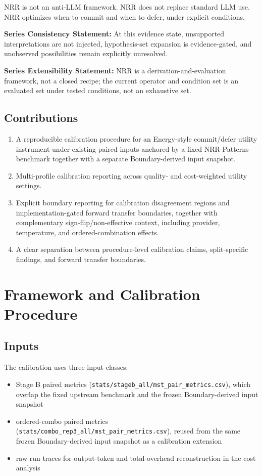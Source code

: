\documentclass[11pt,a4paper]{article}
\begin{document}
NRR is not an anti-LLM framework.
NRR does not replace standard LLM use.
NRR optimizes when to commit and when to defer, under explicit conditions.

\textbf{Series Consistency Statement:}
At this evidence state, unsupported interpretations are not injected, hypothesis-set expansion is evidence-gated, and unobserved possibilities remain explicitly unresolved.

\textbf{Series Extensibility Statement:}
NRR is a derivation-and-evaluation framework, not a closed recipe; the current operator and condition set is an evaluated set under tested conditions, not an exhaustive set.

\subsection{Contributions}

\begin{enumerate}
  \item A reproducible calibration procedure for an Energy-style commit/defer utility instrument under existing paired inputs anchored by a fixed NRR-Patterns benchmark together with a separate Boundary-derived input snapshot.
  \item Multi-profile calibration reporting across quality- and cost-weighted utility settings.
  \item Explicit boundary reporting for calibration disagreement regions and implementation-gated forward transfer boundaries, together with complementary sign-flip/non-effective context, including provider, temperature, and ordered-combination effects.
  \item A clear separation between procedure-level calibration claims, split-specific findings, and forward transfer boundaries.
\end{enumerate}

\section{Framework and Calibration Procedure}
\label{sec:framework}

\subsection{Inputs}
\label{sec:inputs}

The calibration uses three input classes:
\begin{itemize}
  \item Stage B paired metrics (\texttt{stats/stageb\_all/mst\_pair\_metrics.csv}), which overlap the fixed upstream benchmark and the frozen Boundary-derived input snapshot
  \item ordered-combo paired metrics (\texttt{stats/combo\_rep3\_all/mst\_pair\_metrics.csv}), reused from the same frozen Boundary-derived input snapshot as a calibration extension
  \item raw run traces for output-token and total-overhead reconstruction in the cost analysis
\end{itemize}
\end{document}
